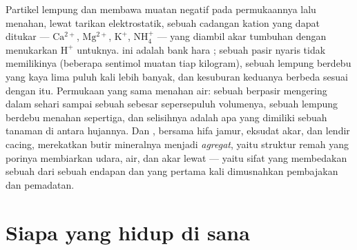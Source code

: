 \begin{proposition}\label{prop:b2:living-soil:cec}
Partikel lempung dan  membawa muatan negatif pada permukaannya
lalu menahan, lewat tarikan elektrostatik, sebuah cadangan kation yang
dapat ditukar --- $\mathrm{Ca^{2+}}$, $\mathrm{Mg^{2+}}$,
$\mathrm{K^{+}}$, $\mathrm{NH_4^{+}}$ --- yang diambil akar tumbuhan
dengan menukarkan $\mathrm{H^{+}}$ untuknya. \emph{} ini adalah bank hara ; sebuah pasir nyaris tidak
memilikinya (beberapa sentimol muatan tiap kilogram), sebuah lempung
berdebu yang kaya  lima puluh kali lebih banyak, dan kesuburan
keduanya berbeda sesuai dengan itu. Permukaan yang sama menahan air:
sebuah  berpasir mengering dalam sehari sampai sebuah
\emph{} sebesar sepersepuluh volumenya, sebuah lempung
berdebu menahan sepertiga, dan selisihnya adalah apa yang dimiliki
sebuah tanaman di antara hujannya. Dan , bersama hifa jamur,
eksudat akar, dan lendir cacing, merekatkan butir mineralnya menjadi
\emph{agregat}, yaitu struktur remah yang porinya membiarkan udara,
air, dan akar lewat --- yaitu sifat yang membedakan sebuah  dari
sebuah endapan dan yang pertama kali dimusnahkan pembajakan dan
pemadatan.
\end{proposition}

\section{Siapa yang hidup di sana}

